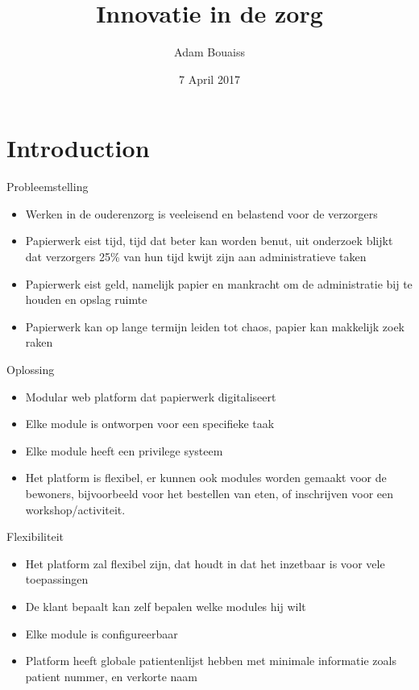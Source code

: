 \documentclass{beamer}
\title[Innovatie in de zorg]{Innovatie in de zorg}
\author{Adam Bouaiss}
\institute{Hogeschool Rotterdam}
\date{7 April 2017}
\begin{document}
\begin{frame}
  \titlepage
\end{frame}


\section{Introduction}

\begin{frame}{Probleemstelling}

\begin{itemize}
  \item Werken in de ouderenzorg is veeleisend en belastend voor de
verzorgers
  \item Papierwerk eist tijd, tijd dat beter kan worden benut, uit
onderzoek blijkt dat verzorgers 25\% van hun tijd kwijt zijn
aan administratieve taken
  \item Papierwerk eist geld, namelijk papier en mankracht om de
administratie bij te houden en opslag ruimte
  \item Papierwerk kan op lange termijn leiden tot chaos, papier kan
makkelijk zoek raken

\end{itemize}

\vskip 1cm

\end{frame}

\begin{frame}{Oplossing}

\begin{itemize}
  \item Modular web platform dat papierwerk digitaliseert
  \item Elke module is ontworpen voor een specifieke taak
  \item Elke module heeft een privilege systeem
  \item Het platform is flexibel, er kunnen ook modules worden gemaakt voor de
bewoners, bijvoorbeeld voor het bestellen van eten, of inschrijven voor een
workshop/activiteit.

\end{itemize}

\vskip 1cm

\end{frame}

\begin{frame}{Flexibiliteit}

\begin{itemize}
  \item Het platform zal flexibel zijn, dat houdt in dat het inzetbaar is voor vele
toepassingen
  \item De klant bepaalt kan zelf bepalen welke modules hij wilt
  \item Elke module is configureerbaar
  \item Platform heeft globale patientenlijst hebben met minimale informatie zoals
patient nummer, en verkorte naam

\end{itemize}

\vskip 1cm

\end{frame}
\end{document}
